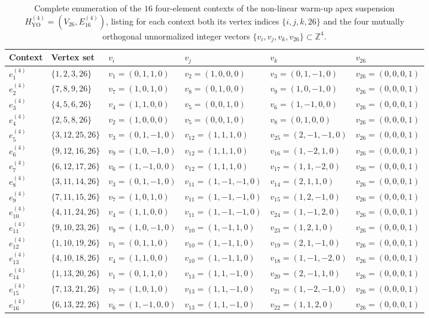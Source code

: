 \documentclass[
  aps,
  pra,
  reprint,
  superscriptaddress,
  amsmath,
  amssymb,
  nofootinbib,
  floatfix
]{revtex4-2}
\theoremstyle{definition}
\theoremstyle{remark}
\newcommand{\YO}{\mathrm{YO}}
\begin{document}
\begin{table}[t]
\caption{Complete enumeration of the $16$ four-element contexts of the non-linear warm-up apex suspension $H_{\YO}^{(4)}=(V_{26},E_{16}^{(4)})$, listing for each context both its vertex indices $\{i,j,k,26\}$ and the four mutually orthogonal unnormalized integer vectors $\{v_i,v_j,v_k,v_{26}\}\subset\mathbb{Z}^4$.}\label{tab:app-hyo4-contexts}
\scriptsize
\begin{ruledtabular}
\begin{tabular}{llllll}
Context & Vertex set & $v_i$ & $v_j$ & $v_k$ & $v_{26}$ \\ \hline
$e_1^{(4)}$  & $\{1,2,3,26\}$   & $v_1=(0,1,1,0)$  & $v_2=(1,0,0,0)$    & $v_3=(0,1,-1,0)$    & $v_{26}=(0,0,0,1)$ \\
$e_2^{(4)}$  & $\{7,8,9,26\}$   & $v_7=(1,0,1,0)$  & $v_8=(0,1,0,0)$    & $v_9=(1,0,-1,0)$    & $v_{26}=(0,0,0,1)$ \\
$e_3^{(4)}$  & $\{4,5,6,26\}$   & $v_4=(1,1,0,0)$  & $v_5=(0,0,1,0)$    & $v_6=(1,-1,0,0)$    & $v_{26}=(0,0,0,1)$ \\
$e_4^{(4)}$  & $\{2,5,8,26\}$   & $v_2=(1,0,0,0)$  & $v_5=(0,0,1,0)$    & $v_8=(0,1,0,0)$     & $v_{26}=(0,0,0,1)$ \\ \hline
$e_5^{(4)}$  & $\{3,12,25,26\}$ & $v_3=(0,1,-1,0)$ & $v_{12}=(1,1,1,0)$ & $v_{25}=(2,-1,-1,0)$& $v_{26}=(0,0,0,1)$ \\
$e_6^{(4)}$  & $\{9,12,16,26\}$ & $v_9=(1,0,-1,0)$ & $v_{12}=(1,1,1,0)$ & $v_{16}=(1,-2,1,0)$ & $v_{26}=(0,0,0,1)$ \\
$e_7^{(4)}$  & $\{6,12,17,26\}$ & $v_6=(1,-1,0,0)$ & $v_{12}=(1,1,1,0)$ & $v_{17}=(1,1,-2,0)$ & $v_{26}=(0,0,0,1)$ \\
$e_8^{(4)}$  & $\{3,11,14,26\}$ & $v_3=(0,1,-1,0)$ & $v_{11}=(1,-1,-1,0)$&$v_{14}=(2,1,1,0)$  & $v_{26}=(0,0,0,1)$ \\
$e_9^{(4)}$  & $\{7,11,15,26\}$ & $v_7=(1,0,1,0)$  & $v_{11}=(1,-1,-1,0)$&$v_{15}=(1,2,-1,0)$ & $v_{26}=(0,0,0,1)$ \\
$e_{10}^{(4)}$ & $\{4,11,24,26\}$ & $v_4=(1,1,0,0)$  & $v_{11}=(1,-1,-1,0)$&$v_{24}=(1,-1,2,0)$ & $v_{26}=(0,0,0,1)$ \\
$e_{11}^{(4)}$ & $\{9,10,23,26\}$ & $v_9=(1,0,-1,0)$ & $v_{10}=(1,-1,1,0)$ & $v_{23}=(1,2,1,0)$  & $v_{26}=(0,0,0,1)$ \\
$e_{12}^{(4)}$ & $\{1,10,19,26\}$ & $v_1=(0,1,1,0)$  & $v_{10}=(1,-1,1,0)$ & $v_{19}=(2,1,-1,0)$ & $v_{26}=(0,0,0,1)$ \\
$e_{13}^{(4)}$ & $\{4,10,18,26\}$ & $v_4=(1,1,0,0)$  & $v_{10}=(1,-1,1,0)$ & $v_{18}=(1,-1,-2,0)$& $v_{26}=(0,0,0,1)$ \\
$e_{14}^{(4)}$ & $\{1,13,20,26\}$ & $v_1=(0,1,1,0)$  & $v_{13}=(1,1,-1,0)$ & $v_{20}=(2,-1,1,0)$ & $v_{26}=(0,0,0,1)$ \\
$e_{15}^{(4)}$ & $\{7,13,21,26\}$ & $v_7=(1,0,1,0)$  & $v_{13}=(1,1,-1,0)$ & $v_{21}=(1,-2,-1,0)$& $v_{26}=(0,0,0,1)$ \\
$e_{16}^{(4)}$ & $\{6,13,22,26\}$ & $v_6=(1,-1,0,0)$ & $v_{13}=(1,1,-1,0)$ & $v_{22}=(1,1,2,0)$  & $v_{26}=(0,0,0,1)$
\end{tabular}
\end{ruledtabular}
\end{table}
\end{document}

